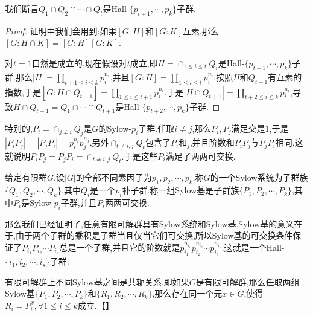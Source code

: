我们断言$Q_1\cap Q_2\cap\cdots\cap Q_t$是Hall-$\{p_{t+1},\cdots,p_k\}$子群.
\begin{proof}
	
	证明中我们会用到:如果$[G:H]$和$[G:K]$互素,那么$[G:H\cap K]=[G:H][G:K]$.
	
	对$t=1$自然是成立的,现在假设对$t$成立,即$H=\cap_{1\le i\le t}Q_i$是Hall-$\{p_{t+1},\cdots,p_k\}$子群.那么$|H|=\prod_{t+1\le i\le k}p_i^{n_i}$,并且$[G:H]=\prod_{1\le i\le t}p_i^{n_i}$.按照$H$和$Q_{t+1}$有互素的指数,于是$[G:H\cap Q_{t+1}]=\prod_{1\le i\le t+1}p_i^{n_i}$.于是$|H\cap Q_{t+1}|=\prod_{t+2\le i\le k}p_i^{n_i}$,导致$H\cap Q_{t+1}=Q_1\cap\cdots\cap Q_{t+1}$是Hall-$\{p_{t+2},\cdots,p_k\}$子群.
\end{proof}

特别的,$P_i=\cap_{j\not=i}Q_j$是$G$的Sylow-$p_i$子群.任取$i\not=j$,那么$P_i,P_j$满足交是1,于是$|P_iP_j|=|P_jP_i|=p_i^{n_i}p_j^{n_j}$,另外$\cap_{t\not=i,j}Q_t$包含了$P_i$和$_j$,并且阶数和$P_iP_j$与$P_jP_i$相同,这就说明$P_iP_j=P_jP_i=\cap_{t\not=i,j}Q_t$.于是这些$P_i$满足了两两可交换.

给定有限群$G$,设$|G|$的全部不同素因子为$p_1,p_2,\cdots,p_k$.称$G$的一个Sylow系统为子群族$\{Q_1,$$Q_2,\cdots,Q_k\}$,其中$Q_i$是一个$p_i$补子群.称一组Sylow基是子群族$\{P_1,P_2,\cdots,P_k\}$,其中$P_i$是Sylow-$p_i$子群,并且$P_i$两两可交换.

那么我们已经证明了,任意有限可解群具有Sylow系统和Sylow基.Sylow基的意义在于,由于两个子群的乘积是子群当且仅当它们可交换,所以Sylow基的可交换条件保证了$P_{i_1}P_{i_2}\cdots P_{i_s}$总是一个子群,并且它的阶数就是$p_{i_1}^{n_{i_1}}p_{i_2}^{n_{i_2}}\cdots p_{i_s}^{n_{i_s}}$.这就是一个Hall-$\{i_1,i_2,\cdots,i_s\}$子群.

有限可解群上不同Sylow基之间是共轭关系.即如果$G$是有限可解群,那么任取两组Sylow基$\{P_1,P_2,\cdots,P_k\}$和$\{R_1,R_2,\cdots,R_k\}$,那么存在同一个元$x\in G$,使得$R_i=P_i^x,\forall 1\le i\le k$成立.【】

